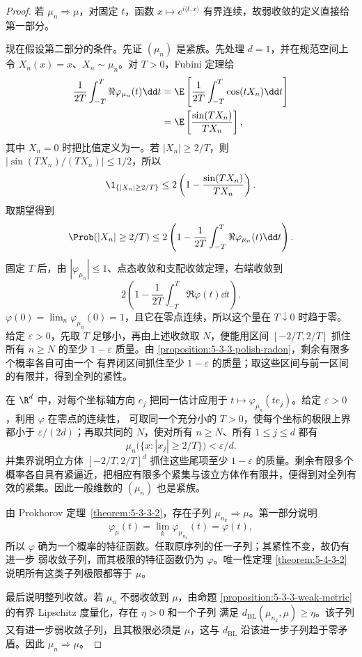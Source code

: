 \begin{proof}
若 $\mu_n\Rightarrow\mu$，对固定 $t$，函数
$x\mapsto e^{i\langle t,x\rangle}$ 有界连续，故弱收敛的定义直接给第一部分。

现在假设第二部分的条件。先证 $(\mu_n)$ 是紧族。先处理 $d=1$，并在规范空间上令
$X_n(x)=x$、$X_n\sim\mu_n$。对 $T>0$，Fubini 定理给
\begin{align*}
 \frac1{2T}\int_{-T}^T\Re\varphi_{\mu_n}(t)\dd t
 &=\E\left[\frac1{2T}\int_{-T}^T\cos(tX_n)\dd t\right]\\
 &=\E\left[\frac{\sin(TX_n)}{TX_n}\right],
\end{align*}
其中 $X_n=0$ 时把比值定义为一。若 $|X_n|\geq2/T$，则
$|\sin(TX_n)/(TX_n)|\leq1/2$，所以
\[
 \1_{\{|X_n|\geq2/T\}}
 \leq2\left(1-\frac{\sin(TX_n)}{TX_n}\right).
\]
取期望得到
\begin{equation}\label{eq:levy-tightness-estimate}
 \Prob(|X_n|\geq2/T)
 \leq2\left(1-\frac1{2T}\int_{-T}^T
                 \Re\varphi_{\mu_n}(t)\dd t\right).
\end{equation}
固定 $T$ 后，由 $|\varphi_{\mu_n}|\leq1$、点态收敛和支配收敛定理，右端收敛到
\[
 2\left(1-\frac1{2T}\int_{-T}^T\Re\varphi(t)\dd t\right).
\]
$\varphi(0)=\lim_n\varphi_{\mu_n}(0)=1$，且它在零点连续，所以这个量在
$T\downarrow0$ 时趋于零。给定
$\varepsilon>0$，先取 $T$ 足够小，再由上述收敛取 $N$，便能用区间
$[-2/T,2/T]$ 抓住所有 $n\geq N$ 的至少 $1-\varepsilon$ 质量。由
\cref{proposition:5-3-3-polish-radon}，剩余有限多个概率各自可由一个
有界闭区间抓住至少 $1-\varepsilon$ 的质量；取这些区间与前一区间的有限并，得到全列的紧性。

在 $\R^d$ 中，对每个坐标轴方向 $e_j$ 把同一估计应用于
$t\mapsto\varphi_{\mu_n}(te_j)$。给定 $\varepsilon>0$，利用 $\varphi$ 在零点的连续性，
可取同一个充分小的 $T>0$，使每个坐标的极限上界都小于 $\varepsilon/(2d)$；再取共同的
$N$，使对所有 $n\geq N$、所有 $1\leq j\leq d$ 都有
\[
 \mu_n\bigl(\{x:|x_j|\geq2/T\}\bigr)<\varepsilon/d.
\]
并集界说明立方体 $[-2/T,2/T]^d$ 抓住这些尾项至少 $1-\varepsilon$ 的质量。剩余有限多个
概率各自具有紧逼近，把相应有限多个紧集与该立方体作有限并，便得到对全列有效的紧集。因此一般维数的
$(\mu_n)$ 也是紧族。

由 Prokhorov 定理~\ref{theorem:5-3-3-2}，存在子列
$\mu_{n_k}\Rightarrow\mu$。第一部分说明
\[
 \varphi_\mu(t)=\lim_k\varphi_{\mu_{n_k}}(t)=\varphi(t),
\]
所以 $\varphi$ 确为一个概率的特征函数。任取原序列的任一子列；其紧性不变，故仍有进一步
弱收敛子列，而其极限的特征函数仍为 $\varphi$。唯一性定理
\ref{theorem:5-4-3-2} 说明所有这类子列极限都等于 $\mu$。

最后说明整列收敛。若 $\mu_n$ 不弱收敛到 $\mu$，由命题
\ref{proposition:5-3-3-weak-metric} 的有界 Lipschitz 度量化，存在 $\eta>0$ 和一个子列
满足 $d_{\mathrm{BL}}(\mu_{n_k},\mu)\geq\eta$。该子列又有进一步弱收敛子列，且其极限必须是
$\mu$，这与 $d_{\mathrm{BL}}$ 沿该进一步子列趋于零矛盾。因此 $\mu_n\Rightarrow\mu$。
\end{proof}


